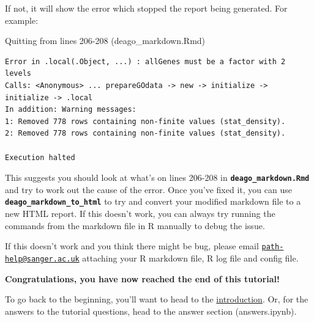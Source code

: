 \documentclass[11pt]{article}
\begin{document}
If not, it will show the error which stopped the report being generated.
For example:

Quitting from lines 206-208 (deago\_markdown.Rmd)

\begin{verbatim}
Error in .local(.Object, ...) : allGenes must be a factor with 2 levels
Calls: <Anonymous> ... prepareGOdata -> new -> initialize -> initialize -> .local
In addition: Warning messages:
1: Removed 778 rows containing non-finite values (stat_density).
2: Removed 778 rows containing non-finite values (stat_density).

Execution halted
\end{verbatim}

This suggests you should look at what's on lines 206-208 in
\textbf{\texttt{deago\_markdown.Rmd}} and try to work out the cause of
the error. Once you've fixed it, you can use
\textbf{\texttt{deago\_markdown\_to\_html}} to try and convert your
modified markdown file to a new HTML report. If this doesn't work, you
can always try running the commands from the markdown file in R manually
to debug the issue.

If this doesn't work and you think there might be bug, please email
\href{mailto:path-help@sanger.ac.uk}{\nolinkurl{path-help@sanger.ac.uk}}
attaching your R markdown file, R log file and config file.

    \textbf{Congratulations, you have now reached the end of this tutorial!}

To go back to the beginning, you'll want to head to the
\href{index.ipynb}{introduction}. Or, for the answers to the tutorial
questions, head to the answer section (answers.ipynb).


\end{document}
